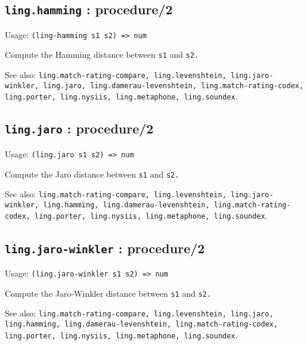 \documentclass[
]{article}
\newcommand{\passthrough}[1]{#1}
\begin{document}
\hypertarget{ling.hamming-procedure2-1}{%
\subsection{\texorpdfstring{\texttt{ling.hamming} :
procedure/2}{ling.hamming : procedure/2}}\label{ling.hamming-procedure2-1}}

Usage: \passthrough{\lstinline!(ling-hamming s1 s2) => num!}

Compute the Hamming distance between \passthrough{\lstinline!s1!} and
\passthrough{\lstinline!s2.!}

See also:
\passthrough{\lstinline!ling.match-rating-compare, ling.levenshtein, ling.jaro-winkler, ling.jaro, ling.damerau-levenshtein, ling.match-rating-codex, ling.porter, ling.nysiis, ling.metaphone, ling.soundex!}.

\hypertarget{ling.jaro-procedure2-1}{%
\subsection{\texorpdfstring{\texttt{ling.jaro} :
procedure/2}{ling.jaro : procedure/2}}\label{ling.jaro-procedure2-1}}

Usage: \passthrough{\lstinline!(ling.jaro s1 s2) => num!}

Compute the Jaro distance between \passthrough{\lstinline!s1!} and
\passthrough{\lstinline!s2.!}

See also:
\passthrough{\lstinline!ling.match-rating-compare, ling.levenshtein, ling.jaro-winkler, ling.hamming, ling.damerau-levenshtein, ling.match-rating-codex, ling.porter, ling.nysiis, ling.metaphone, ling.soundex!}.

\hypertarget{ling.jaro-winkler-procedure2-1}{%
\subsection{\texorpdfstring{\texttt{ling.jaro-winkler} :
procedure/2}{ling.jaro-winkler : procedure/2}}\label{ling.jaro-winkler-procedure2-1}}

Usage: \passthrough{\lstinline!(ling.jaro-winkler s1 s2) => num!}

Compute the Jaro-Winkler distance between \passthrough{\lstinline!s1!}
and \passthrough{\lstinline!s2.!}

See also:
\passthrough{\lstinline!ling.match-rating-compare, ling.levenshtein, ling.jaro, ling.hamming, ling.damerau-levenshtein, ling.match-rating-codex, ling.porter, ling.nysiis, ling.metaphone, ling.soundex!}.
\end{document}
